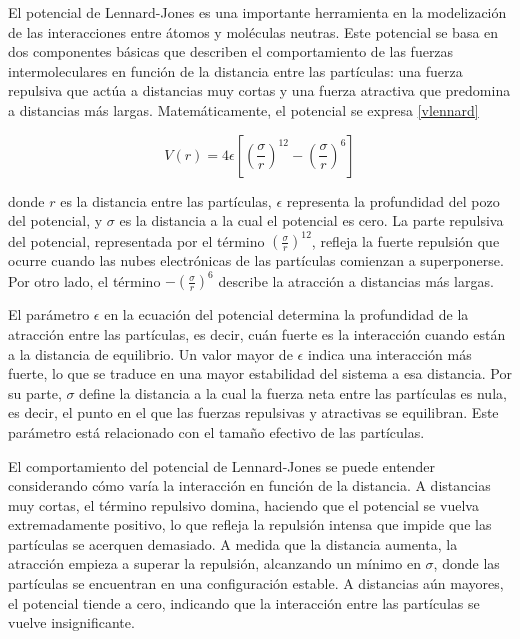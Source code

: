 El potencial de Lennard-Jones es una importante herramienta  en la modelización de las interacciones entre átomos y moléculas neutras. Este potencial se basa en dos componentes básicas que describen el comportamiento de las fuerzas intermoleculares en función de la distancia entre las partículas: una fuerza repulsiva que actúa a distancias muy cortas y una fuerza atractiva que predomina a distancias más largas. Matemáticamente, el potencial se expresa \ref{vlennard}

\begin{equation} \label{vlennard}
	V(r) = 4\epsilon \left[ \left(\frac{\sigma}{r}\right)^{12} - \left(\frac{\sigma}{r}\right)^{6} \right]
\end{equation} 

\vspace{\baselineskip}

 
donde \( r \) es la distancia entre las partículas, \( \epsilon \) representa la profundidad del pozo del potencial, y \( \sigma \) es la distancia a la cual el potencial es cero. La parte repulsiva del potencial, representada por el término \(\left(\frac{\sigma}{r}\right)^{12}\), refleja la fuerte repulsión que ocurre cuando las nubes electrónicas de las partículas comienzan a superponerse.  Por otro lado, el término \(-\left(\frac{\sigma}{r}\right)^{6}\) describe la atracción a distancias más largas.

\vspace{\baselineskip}

El parámetro \( \epsilon \) en la ecuación del potencial determina la profundidad de la atracción entre las partículas, es decir, cuán fuerte es la interacción cuando están a la distancia de equilibrio. Un valor mayor de \( \epsilon \) indica una interacción más fuerte, lo que se traduce en una mayor estabilidad del sistema a esa distancia. Por su parte, \( \sigma \) define la distancia a la cual la fuerza neta entre las partículas es nula, es decir, el punto en el que las fuerzas repulsivas y atractivas se equilibran. Este parámetro está relacionado con el tamaño efectivo de las partículas.


\vspace{\baselineskip}

El comportamiento del potencial de Lennard-Jones se puede entender considerando cómo varía la interacción en función de la distancia. A distancias muy cortas, el término repulsivo domina, haciendo que el potencial se vuelva extremadamente positivo, lo que refleja la repulsión intensa que impide que las partículas se acerquen demasiado. A medida que la distancia aumenta, la atracción empieza a superar la repulsión, alcanzando un mínimo en \( \sigma \), donde las partículas se encuentran en una configuración estable. A distancias aún mayores, el potencial tiende a cero, indicando que la interacción entre las partículas se vuelve insignificante.



